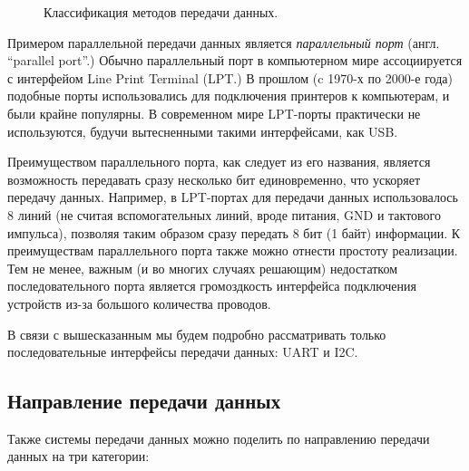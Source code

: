 \documentclass[../sparc.tex]{subfiles}
\begin{document}
\begin{figure}[H]
  \centering
  \caption{Классификация методов передачи данных.}
  \label{fig:communication-data-transfer-categories}
\end{figure}

Примером параллельной передачи данных является \emph{параллельный порт} (англ.
``parallel port''.) Обычно параллельный порт в компьютерном мире ассоциируется с
интерфейом Line Print Terminal (\gls{LPT}.)  В прошлом (c 1970-х по 2000-е года)
подобные порты использовались для подключения принтеров к компьютерам, и были
крайне популярны.  В современном мире LPT-порты практически не используются,
будучи вытесненными такими интерфейсами, как USB.

Преимуществом параллельного порта, как следует из его названия, является
возможность передавать сразу несколько бит единовременно, что ускоряет передачу
данных.  Например, в LPT-портах для передачи данных использовалось 8 линий (не
считая вспомогательных линий, вроде питания, GND и тактового импульса), позволяя
таким образом сразу передать 8 бит (1 байт) информации.  К преимуществам
параллельного порта также можно отнести простоту реализации.  Тем не менее,
важным (и во многих случаях решающим) недостатком последовательного порта
является громоздкость интерфейса подключения устройств из-за большого количества
проводов.

В связи с вышесказанным мы будем подробно рассматривать только последовательные
интерфейсы передачи данных: UART и I2C.

\subsection{Направление передачи данных}

Также системы передачи данных можно поделить по направлению передачи данных на
три категории:
\end{document}
